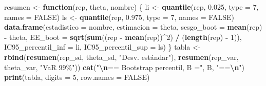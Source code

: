 \documentclass[
  spanish,
]{article}
\newenvironment{Shaded}{\begin{snugshade}}{\end{snugshade}}
\newcommand{\AttributeTok}[1]{\textcolor[rgb]{0.13,0.29,0.53}{#1}}
\newcommand{\ConstantTok}[1]{\textcolor[rgb]{0.56,0.35,0.01}{#1}}
\newcommand{\ControlFlowTok}[1]{\textcolor[rgb]{0.13,0.29,0.53}{\textbf{#1}}}
\newcommand{\DecValTok}[1]{\textcolor[rgb]{0.00,0.00,0.81}{#1}}
\newcommand{\FloatTok}[1]{\textcolor[rgb]{0.00,0.00,0.81}{#1}}
\newcommand{\FunctionTok}[1]{\textcolor[rgb]{0.13,0.29,0.53}{\textbf{#1}}}
\newcommand{\NormalTok}[1]{#1}
\newcommand{\OtherTok}[1]{\textcolor[rgb]{0.56,0.35,0.01}{#1}}
\newcommand{\SpecialCharTok}[1]{\textcolor[rgb]{0.81,0.36,0.00}{\textbf{#1}}}
\newcommand{\StringTok}[1]{\textcolor[rgb]{0.31,0.60,0.02}{#1}}
\begin{document}
\begin{Shaded}
\begin{Highlighting}[]
\NormalTok{resumen }\OtherTok{\textless{}{-}} \ControlFlowTok{function}\NormalTok{(rep, theta, nombre) \{}
\NormalTok{  li }\OtherTok{\textless{}{-}} \FunctionTok{quantile}\NormalTok{(rep, }\FloatTok{0.025}\NormalTok{, }\AttributeTok{type =} \DecValTok{7}\NormalTok{, }\AttributeTok{names =} \ConstantTok{FALSE}\NormalTok{)}
\NormalTok{  ls }\OtherTok{\textless{}{-}} \FunctionTok{quantile}\NormalTok{(rep, }\FloatTok{0.975}\NormalTok{, }\AttributeTok{type =} \DecValTok{7}\NormalTok{, }\AttributeTok{names =} \ConstantTok{FALSE}\NormalTok{)}
  \FunctionTok{data.frame}\NormalTok{(}\AttributeTok{estadistico =}\NormalTok{ nombre, }\AttributeTok{estimacion =}\NormalTok{ theta,}
             \AttributeTok{sesgo\_boot =} \FunctionTok{mean}\NormalTok{(rep) }\SpecialCharTok{{-}}\NormalTok{ theta,}
             \AttributeTok{EE\_boot =} \FunctionTok{sqrt}\NormalTok{(}\FunctionTok{sum}\NormalTok{((rep }\SpecialCharTok{{-}} \FunctionTok{mean}\NormalTok{(rep))}\SpecialCharTok{\^{}}\DecValTok{2}\NormalTok{) }\SpecialCharTok{/}\NormalTok{ (}\FunctionTok{length}\NormalTok{(rep) }\SpecialCharTok{{-}} \DecValTok{1}\NormalTok{)),}
             \AttributeTok{IC95\_percentil\_inf =}\NormalTok{ li, }\AttributeTok{IC95\_percentil\_sup =}\NormalTok{ ls)}
\NormalTok{\}}
\NormalTok{tabla }\OtherTok{\textless{}{-}} \FunctionTok{rbind}\NormalTok{(}\FunctionTok{resumen}\NormalTok{(rep\_sd, theta\_sd, }\StringTok{"Desv. estándar"}\NormalTok{),}
               \FunctionTok{resumen}\NormalTok{(rep\_var, theta\_var, }\StringTok{"VaR 99\%"}\NormalTok{))}
\FunctionTok{cat}\NormalTok{(}\StringTok{"}\SpecialCharTok{\textbackslash{}n}\StringTok{== Bootstrap percentil, B ="}\NormalTok{, B, }\StringTok{"==}\SpecialCharTok{\textbackslash{}n}\StringTok{"}\NormalTok{)}
\FunctionTok{print}\NormalTok{(tabla, }\AttributeTok{digits =} \DecValTok{5}\NormalTok{, }\AttributeTok{row.names =} \ConstantTok{FALSE}\NormalTok{)}


\end{Highlighting}
\end{Shaded}
\end{document}
